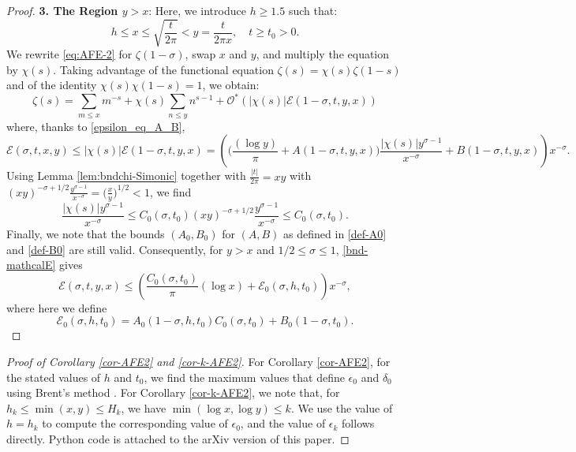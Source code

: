 \documentclass[11pt,letterpaper,oneside,reqno]{amsart}
\renewcommand{\^}[1]{\widehat{#1}}
\newcommand{\s}{\sigma}
\numberwithin{equation}{section}
\theoremstyle{remark}
\begin{document}
\begin{proof}
\smallskip
\textbf{3. The Region $y>x$}:
Here, we introduce $h\geq 1.5$ such that:
\[
h \leq x \leq \sqrt{\frac{t}{2\pi}} < y = \frac{t}{2\pi x}, \quad t  \geq t_0 > 0.
\]
We rewrite \eqref{eq:AFE-2} for $\zeta(1-\sigma)$, swap $x$ and $y$, 
and multiply the equation by $\chi(s)$. Taking advantage of the functional equation $\zeta(s) = \chi(s)\zeta(1-s)$ and of the identity $\chi(s)\chi(1-s) = 1$, we obtain:
 \begin{equation}
    \zeta(s) = \sum_{m \leq x} m^{-s} + \chi(s)\sum_{n \leq y} n^{s-1} + \mathcal{O}^*( |\chi(s)|\mathcal{E}(1-\sigma, t, y, x)) \label{zeta:swap_x&y}
    \end{equation}
where, thanks to \eqref{epsilon_eq_A_B}, 
\begin{equation} \label{bnd-mathcalE}
\mathcal{E}(\sigma, t, x, y)
\leq |\chi(s)|\mathcal{E}(1-\sigma, t, y, x) = \left( \Big( \frac{(\log y)}{\pi}
+A(1-\sigma, t, y, x) \Big)\frac{|\chi(s)|y^{\sigma-1}}{x^{-\s}} + B(1-\sigma, t, y, x) \right)x^{-\s}.
 \end{equation}
Using Lemma \ref{lem:bndchi-Simonic} together with $ \frac{|t|}{2\pi }=xy$ with 
$\left( xy \right)^{-\sigma + 1/2}
 \frac{ y^{\sigma-1}}{x^{-\sigma}}
 = \big(\frac{x}y\big)^{1/2} <1 $, we find
\[
\frac{|\chi(s)|y^{\sigma-1}}{x^{-\sigma}} \leq
C_0(\sigma,t_0)  \left( xy \right)^{-\sigma + 1/2}
 \frac{ y^{\sigma-1}}{x^{-\sigma}}
 \leq
C_0(\sigma,t_0) .
\]
Finally, we note that the bounds $(A_0,B_0)$ for $(A,B)$ as defined in \eqref{def-A0} and \eqref{def-B0} are still valid. Consequently, for $y > x$ and $1/2\leq \sigma \leq 1$, \eqref{bnd-mathcalE} gives
\begin{equation}
\mathcal{E}(\sigma, t, y, x) \leq 
\left(
\frac{C_0(\sigma,t_0)}{\pi} (\log x)
+\mathcal{E}_0(\sigma, h, t_0) \right)x^{-\s},
\end{equation}
where here we define
\begin{equation}
\mathcal{E}_0(\sigma, h, t_0)
=A_{0}(1-\sigma,h,t_0)C_0(\sigma,t_0)  + B_{0}(1-\sigma,t_0) .
\end{equation}
\end{proof}
%
\begin{proof}[Proof of Corollary \ref{cor-AFE2} and \ref{cor-k-AFE2}]
For Corollary \ref{cor-AFE2}, for the stated values of $h$ and $t_0$, we find the maximum values that define $\epsilon_0$ and $\delta_0$ using Brent's method \cite{Brent}. For Corollary \ref{cor-k-AFE2}, we note that, for $h_k\le \min(x,y)\le H_k$, we have $\min(\log x,\log y)\le k$. We use the value of $h=h_k$ to compute the corresponding value of $\epsilon_0$, and the value of $\epsilon_k$ follows directly. Python code is attached to the arXiv version of this paper. 
\end{proof}
%
%

%
\label{section-biblio}
%

%
\ \newpage
%
\appendix
%
\end{document}
